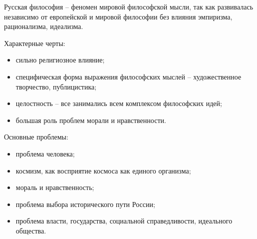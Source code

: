 
Русская философия -- феномен мировой философской мысли, так как развивалась независимо от европейской и мировой философии без влияния эмпиризма, рационализма, идеализма.

Характерные черты:
\begin{itemize}
	\item сильно религиозное влияние;
	\item специфическая форма выражения философских мыслей -- художественное творчество, публицистика;
	\item целостность -- все занимались всем комплексом философских идей;
	\item большая роль проблем морали и нравственности.
\end{itemize}

Основные проблемы:
\begin{itemize}
	\item проблема человека;
	\item космизм, как восприятие космоса как единого организма;
	\item мораль и нравственность;
	\item проблема выбора исторического пути России;
	\item проблема власти, государства, социальной справедливости, идеального общества.
\end{itemize}

